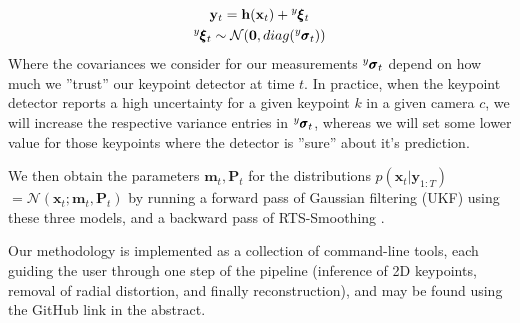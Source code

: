 \documentclass[sigconf, nonacm]{acmart}
\begin{document}
\begin{gather*}
    \mathbf{y}_t = \mathbf{h}(\mathbf{x}_t) + \prescript{y}{}{}\pmb\xi_t \\
    \prescript{y}{}{}\pmb\xi_t \sim \mathcal{N}(\mathbf{0}, diag(\prescript{y}{}{}\pmb\sigma_t))
\end{gather*}
Where the covariances we consider for our measurements $\prescript{y}{}{}\pmb\sigma_t$ depend on how much we ''trust'' our keypoint detector at time $t$. In practice, when the keypoint detector reports a high uncertainty for a given keypoint $k$ in a given camera $c$, we will increase the respective variance entries in $\prescript{y}{}{}\pmb\sigma_t$, whereas we will set some lower value for those keypoints where the detector is ''sure'' about it's prediction. \par
We then obtain the parameters $\mathbf{m}_t, \mathbf{P}_t$ for the distributions $p(\mathbf{x}_t |\mathbf{y}_{1:T})$ $= \mathcal{N}(\mathbf{x}_t; \mathbf{m}_t, \mathbf{P}_t)$ by running a forward pass of Gaussian filtering (UKF) using these three models, and a backward pass of RTS-Smoothing \cite{Srkk2013}.\par
Our methodology is implemented as a collection of command-line tools, each guiding the user through one step of the pipeline (inference of 2D keypoints, removal of radial distortion, and finally reconstruction), and may be found using the GitHub link in the abstract.
\end{document}
